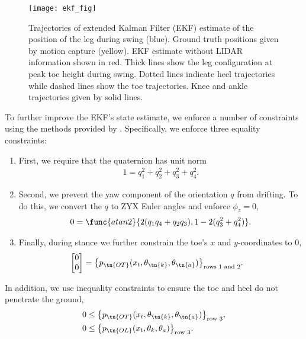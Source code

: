 \begin{figure}[t]
    \centering
    \texttt{[image: ekf\_fig]}
    \caption{Trajectories of extended Kalman Filter (EKF) estimate of the
    position of the leg during swing (blue). Ground truth positions given by
    motion capture (yellow). EKF estimate without LIDAR information shown in
    red. Thick lines show the leg configuration at peak toe height during swing.
    Dotted lines indicate heel trajectories while dashed lines show the toe
    trajectories. Knee and ankle trajectories given by solid lines.}
    \label{fig:ekf}
\end{figure}

To further improve the EKF's state estimate, we enforce a number of
constraints using the methods provided by \citet{gupta2007kalman}. Specifically,
we enforce three equality constraints:
\begin{enumerate}
\item First, we require that the quaternion has unit norm
\begin{align}
    1 = q_1^2 + q_2^2 + q_3^2 + q_4^2.
\end{align}

\item Second, we prevent the yaw component of the orientation $q$ from drifting.
To do this, we convert the $q$ to ZYX Euler angles and enforce $\phi_z = 0$, 
\begin{align}
    0 = \func{atan2}{2 (q_1 q_4 + q_2 q_3), 1 - 2 (q_3^2 + q_4^2)}.
\end{align}

\item Finally, during stance we further constrain the toe's $x$ and
$y$-coordinates to 0,
\begin{align}
    \begin{bmatrix} 0 \\ 0 \end{bmatrix} 
        &= {\left\{p_\tn{OT}(x_t, \theta_\tn{k}, \theta_\tn{a}) 
            \right\}}_\textrm{rows 1 and 2}.
\end{align}
\end{enumerate}

\noindent In addition, we use inequality constraints to ensure the toe and heel
do not penetrate the ground,
\begin{align}
    0 &\le {\left\{p_\tn{OT}(x_t, \theta_\tn{k}, \theta_\tn{a}) 
        \right\}}_\textrm{row 3} ,\\
    0 &\le {\left\{p_\tn{OL}(x_t, \theta_k, \theta_a) 
        \right\}}_\textrm{row 3}.
\end{align}

